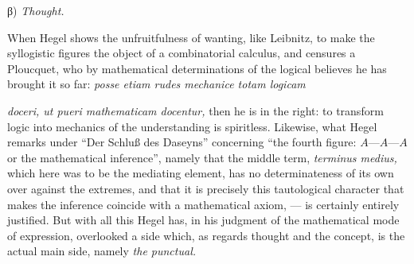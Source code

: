 \documentclass[12pt,a4paper,openany]{book}
\newcommand{\opage}[1]{\marginnote{\footnotesize\textit{[#1]}}}
\begin{document}
\begin{center}β) \emph{Thought.}\end{center}

When Hegel shows the unfruitfulness of wanting, like Leibnitz,
to make the syllogistic figures the object of a combinatorial
calculus, and censures a Ploucquet, who by mathematical
determinations of the logical believes he has brought it
so far: \textit{posse etiam rudes mechanice totam logicam}

\setcounter{footnote}{0}%
\opage{24}\textit{doceri, ut pueri mathematicam docentur,} then he is
in the right: to transform logic into mechanics of the understanding is
spiritless. Likewise, what Hegel remarks under ``Der Schluß des
Daseyns'' concerning ``the fourth figure: $A$---$A$---$A$ or
the mathematical inference'', namely that the middle term,
\textit{terminus medius,} which here was to be the mediating element,
has no determinateness of its own over against the extremes,
and that it is precisely this tautological character that makes
the inference coincide with a mathematical axiom,
--- is certainly entirely justified. But with all this Hegel has, in
his judgment of the mathematical mode of expression, overlooked
a side which, as regards thought and the concept, is the
actual main side, namely \emph{the punctual.}
\end{document}
